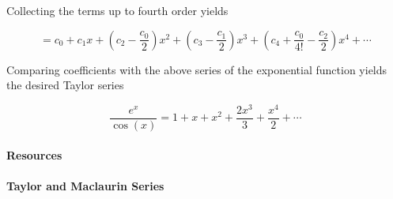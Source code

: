Collecting the terms up to fourth order yields



$$=c _0+c _1x+\left(c _2-\frac{c _0}{2}\right)x^2+\left(c _3-\frac{c _1}{2}\right)x^3+\left(c _4+\frac{c _0}{4!}-\frac{c _2}{2}\right)x^4+\cdots$$

Comparing coefficients with the above series of the exponential function yields the desired Taylor series



$$\frac{e^x}{\cos(x)}=1+x+x^2+\frac{2x^3}{3}+\frac{x^4}{2}+\cdots$$



\paragraph{Resources}



\paragraph{Taylor and Maclaurin Series}



